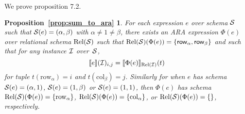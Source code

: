 \newtheorem*{SUMTOARA}{Proposition~\ref{prop:sum_to_ara}}

We prove proposition 7.2.

\begin{SUMTOARA}
  For each \langsum expression $e$ over schema $\mathcal{S}$ such that $\mathcal{S}(e)=(\alpha,\beta)$ with $\alpha\neq 1\neq\beta$, there exists an ARA expression $\Phi(e)$ over relational schema $\text{Rel}(\mathcal{S})$ such that $\text{Rel}(\mathcal{S})(\Phi(e))=\{\mathsf{row}_\alpha,\mathsf{row}_\beta\}$ and 
	such that for any instance $\mathcal{I}$ over~$\mathcal{S}$,
	$$
	\llbracket e \rrbracket(\mathcal{I})_{i,j}=\llbracket \Phi(e) \rrbracket_{\text{Rel}(\mathcal{I})}(t)
	$$
	for tuple $t(\mathrm{row}_\alpha)=i$ and $t(\mathrm{col}_\beta)=j$. Similarly for when $e$ has schema $\mathcal{S}(e)=(\alpha,1)$, $\mathcal{S}(e)=(1,\beta)$ or $\mathcal{S}(e)=(1,1)$, then $\Phi(e)$ has schema $\text{Rel}(\mathcal{S})(\Phi(e))=\{\mathrm{row}_\alpha\}$,
	$\text{Rel}(\mathcal{S})(\Phi(e))=\{\mathrm{col}_\alpha\}$, or
	$\text{Rel}(\mathcal{S})(\Phi(e))=\{\}$, respectively.
\end{SUMTOARA}

